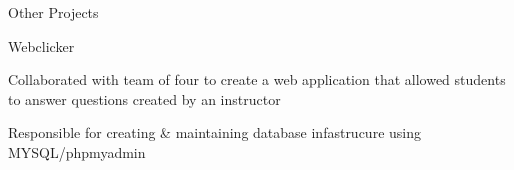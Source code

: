 \documentclass{resume} %
\begin{document}
\begin{rSection}{Other Projects}
    \begin{rSubsection}{Webclicker}{}{}{}
        \item Collaborated with team of four to create a web application that allowed students to answer questions created by an instructor
        \item Responsible for creating \& maintaining database infastrucure using MYSQL/phpmyadmin
    \end{rSubsection}
\end{rSection}





    

\end{document}
